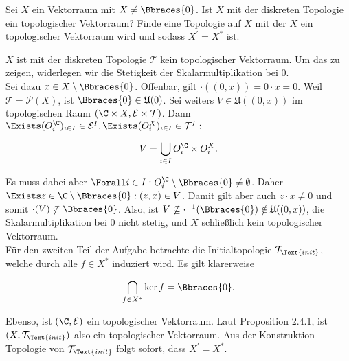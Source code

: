 \begin{exercise}

Sei $X$ ein Vektorraum mit $X \neq \Bbraces{0}$.
Ist $X$ mit der diskreten Topologie ein topologischer Vektorraum?
Finde eine Topologie auf $X$ mit der $X$ ein topologischer Vektorraum wird und sodass $X^\prime = X^\ast$ ist.

\end{exercise}

\begin{solution}

$X$ ist mit der diskreten Topologie $\mathcal{T}$ kein topologischer Vektorraum.
Um das zu zeigen, widerlegen wir die Stetigkeit der Skalarmultiplikation bei $0$. \\

Sei dazu $x \in X \setminus \Bbraces{0}$.
Offenbar, gilt $\cdot((0, x)) = 0 \cdot x = 0$.
Weil $\mathcal{T} = \mathcal{P}(X)$, ist $\Bbraces{0} \in \mathfrak{U}(0)$.
Sei weiters $V \in \mathfrak{U}((0, x))$ im topologischen Raum $(\C \times X, \mathcal{E} \times \mathcal{T})$.
Dann $\Exists (O_i^\C)_{i \in I} \in \mathcal{E}^I, \Exists (O_i^X)_{i \in I} \in \mathcal{T}^I:$

\begin{align*}
  V = \bigcup_{i \in I} O_i^\C \times O_i^X.
\end{align*}

Es muss dabei aber $\Forall i \in I: O_i^\C \setminus \Bbraces{0} \neq \emptyset$.
Daher $\Exists z \in \C \setminus \Bbraces{0}: (z, x) \in V$.
Damit gilt aber auch $z \cdot x \neq 0$ und somit $\cdot(V) \nsubseteq \Bbraces{0}$.
Also, ist $V \not \subseteq \cdot^{-1}(\Bbraces{0}) \notin \mathfrak{U}((0, x))$, die Skalarmultiplikation bei $0$ nicht stetig, und $X$ schließlich kein topologischer Vektorraum. \\

Für den zweiten Teil der Aufgabe betrachte die Initialtopologie $\mathcal{T}_\Text{init}$, welche durch alle $f \in X^\ast$ induziert wird.
Es gilt klarerweise

\begin{align*}
  \bigcap_{f \in X^\ast} \ker f = \Bbraces{0}.
\end{align*}

Ebenso, ist $(\C, \mathcal{E})$ ein topologischer Vektorraum.
Laut Proposition 2.4.1, ist $(X, \mathcal{T}_\Text{init})$ also ein topologischer Vektorraum.
Aus der Konstruktion Topologie von $\mathcal{T}_\Text{init}$ folgt sofort, dass $X^\prime = X^\ast$.

\end{solution}
